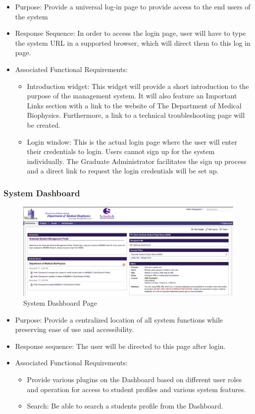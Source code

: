 \documentclass{journal}
\begin{document}
\begin{itemize}
\item Purpose: Provide a universal log-in page to provide access to the end users of the system
\item Response Sequence: In order to access the login page, user will have to type the system URL in a supported browser, which will direct them to this log in page. 
\item Associated Functional Requirements: 
\begin {itemize} 
\item Introduction widget: This widget will provide a short introduction to the purpose of the management system. It will also feature an Important Links section with a link to the website of The Department of Medical Biophysics. Furthermore, a link to a technical troubleshooting page will be created.
\item Login window: This is the actual login page where the user will enter their credentials to login. Users cannot sign up for the system individually. The Graduate Administrator facilitates the sign up process and a direct link to request the login credentials will be set up.
\end{itemize}
\end{itemize}


\subsubsection{System Dashboard}
\begin{figure}[htp]
\centering
\includegraphics[scale=1]{diagrams/HTMLTemplating/Figure2.jpg}
\caption{System Dashboard Page}
\label{fig:SystemDashBoard}
\end{figure}

\begin{itemize}
\item Purpose: Provide a centralized location of all system functions while preserving ease of use and accessibility.
\item Response sequence: The user will be directed to this page after login.
\item Associated Functional Requirements:
\begin{itemize}
\item Provide various plugins on the Dashboard based on different user roles and operation for access to student profiles and various system features. 
\item Search: Be able to search a students profile from the Dashboard.
\end{itemize}
\end{itemize}
\end{document}
